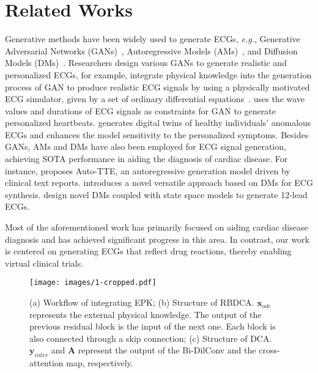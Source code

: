\section{Related Works}
Generative methods have been widely used to generate ECGs, \textit{e.g.}, Generative Adversarial Networks (GANs)~\citep{simone2023ecgan}, Autoregressive Models (AMs)~\citep{chung2023text}, and Diffusion Models (DMs)~\citep{li2024biodiffusion}. Researchers design various GANs to generate realistic and personalized ECGs, for example, \citet{golany2020simgans,golany2021ecg} integrate physical knowledge into the generation process of GAN to produce realistic ECG signals by using a physically motivated ECG simulator, given by a set of ordinary differential equations~\citep{mcsharry2003dynamical}. \citet{golany2019pgans} uses the wave values and durations of ECG signals as constraints for GAN to generate personalized heartbeats. \citet{hu2024personalized} generates digital twins of healthy individuals’ anomalous ECGs and enhances the model sensitivity to the personalized symptoms.
Besides GANs, AMs and DMs have also been employed for ECG signal generation, achieving SOTA performance in aiding the diagnosis of cardiac disease. For instance, \citet{chung2023text} proposes Auto-TTE, an autoregressive generation model driven by clinical text reports. \citet{neifar2023diffecg} introduces a novel versatile approach based on DMs for ECG synthesis. \citet{alcaraz2023diffusion,zama2023ecg} design novel DMs coupled with state space models to generate 12-lead ECGs.

Most of the aforementioned work has primarily focused on aiding cardiac disease diagnosis and has achieved significant progress in this area. In contrast, our work is centered on generating ECGs that reflect drug reactions, thereby enabling virtual clinical trials.



\begin{figure*}[htbp]
    \centering
    \texttt{[image: images/1-cropped.pdf]}
    \caption{(a) Workflow of integrating EPK; (b) Structure of RBDCA. $\mathbf{x}_{ode}$ represents the external physical knowledge. The output of the previous residual block is the input of the next one. Each block is also connected through a skip connection; (c) Structure of DCA. $\mathbf{y}_{inter}$ and $\mathbf{A}$ represent the output of the Bi-DilConv and the cross-attention map, respectively.}
    \label{1}
\end{figure*}